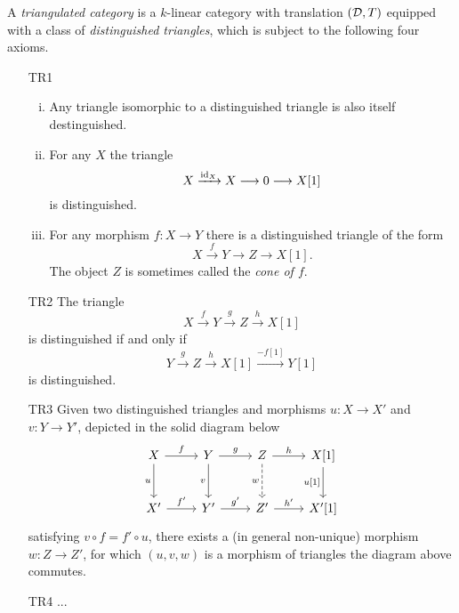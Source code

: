 \begin{definition}
    A \emph{triangulated category} is a $k$-linear category with translation $(\mathcal D, T)$ equipped with a class of \emph{distinguished triangles}, which is subject to the following four axioms.
    \begin{enumerate}
        \item[\textup{TR1}] \begin{enumerate}[(i)]
            \item Any triangle isomorphic to a distinguished triangle is also itself destinguished.
            \item For any $X$ the triangle
            \[
                X \xrightarrow{\operatorname{id}_{X}} X \longrightarrow 0 \longrightarrow X[1]
            \] 
            is distinguished.
            \item For any morphism $f \colon X \to Y$ there is a distinguished triangle of the form
            \[
                X \xrightarrow{\ f \ } Y \longrightarrow Z \longrightarrow X[1].
            \]
            The object $Z$ is sometimes called the \emph{cone of $f$}. 
            \end{enumerate}
        \item[TR2] The triangle
            \[
                X\xrightarrow{\ f \ } Y \xrightarrow{\ g \ } Z \xrightarrow{\ h \ } X[1]
            \]
            is distinguished if and only if
            \[
                Y \xrightarrow{\ g \ } Z \xrightarrow{\ h \ } X[1] \xrightarrow{-f[1]} Y[1]
            \]
            is distinguished.
        \item[TR3] Given two distinguished triangles and morphisms $u\colon X \to X'$ and $v\colon Y \to Y'$, depicted in the solid diagram below 
        \[
        \begin{tikzcd}[column sep = normal, row sep = 2.5em]
            X & Y & Z & {X[1]} \\
            {X'} & {Y'} & {Z'} & {X'[1]}
            \arrow["f", from=1-1, to=1-2]
            \arrow["u"', from=1-1, to=2-1]
            \arrow["g", from=1-2, to=1-3]
            \arrow["v"', from=1-2, to=2-2]
            \arrow["h", from=1-3, to=1-4]
            \arrow["w"', dashed, from=1-3, to=2-3]
            \arrow["{u[1]}"', from=1-4, to=2-4]
            \arrow["{f'}", from=2-1, to=2-2]
            \arrow["{g'}", from=2-2, to=2-3]
            \arrow["{h'}", from=2-3, to=2-4]
        \end{tikzcd}
        \]
        satisfying $v \circ f = f' \circ u$, there exists a (in general non-unique) morphism $w\colon Z \to Z'$, for which $(u, v, w)$ is a morphism of triangles \ie the diagram above commutes. 
        \item[TR4] ...
    \end{enumerate} 
\end{definition}

